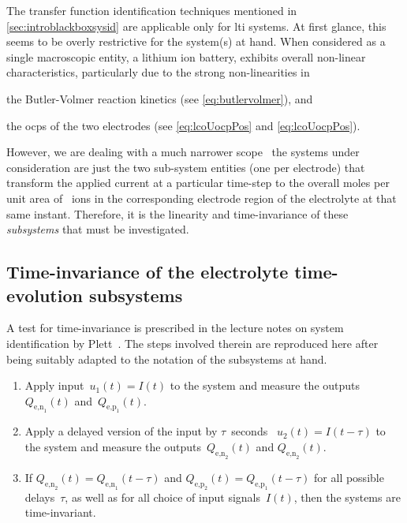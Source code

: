 

The      transfer     function      identification     techniques      mentioned
in \cref{sec:introblackboxsysid} are  applicable only for \gls{lti}  systems. At
first glance,  this seems to  be overly restrictive  for the system(s)  at hand.
When  considered  as  a  single  macroscopic  entity,  a  lithium  ion  battery,
exhibits  overall non-linear  characteristics,  particularly due  to the  strong
non-linearities in
\begin{enumerate*}[label=\emph{\alph*})]
    \item the Butler-Volmer reaction kinetics (see \cref{eq:butlervolmer}), and
    \item the \glspl{ocp} of the two electrodes (see \cref{eq:lcoUocpPos} and \cref{eq:lcoUocpPos}).
\end{enumerate*}
However,  we are  dealing with  a much  narrower scope  \ie~the  systems under
consideration  are just  the two  sub-system entities  (one per  electrode) that
transform the  applied current at  a particular  time-step to the  overall moles
per  unit area  of  ~ions in  the  corresponding  electrode region  of
the  electrolyte at  that  same  instant. Therefore,  it  is  the linearity  and
time-invariance of these \emph{subsystems} that must be investigated.

\subsection{Time-invariance of the electrolyte time-evolution subsystems}\label{subsec:timeinvariance}
A  test  for time-invariance  is  prescribed  in  the  lecture notes  on  system
identification by  Plett~\cite{PlettECE5560_02}. The steps involved  therein are
reproduced here after  being suitably adapted to the notation  of the subsystems
at hand.
\begin{enumerate}
    \item Apply input~${u_1(t) = I(t)}$ to the system and measure the outputs~$Q_{\text{e,n}_1}\!(t)$ and~$Q_{\text{e,p}_1}\!(t)$.
    \item Apply a delayed version of the input by $\tau$~seconds \ie~${u_2(t) = I(t-\tau)}$ to the system and measure the outputs~$Q_{\text{e,n}_2}\!(t)$ and $Q_{\text{e,n}_2}\!(t)$.
    \item If ${Q_{\text{e,n}_2}\!(t) = Q_{\text{e,n}_1}\!(t-\tau)}$ and
        ${Q_{\text{e,p}_2}\!(t) = Q_{\text{e,p}_1}\!(t-\tau)}$ for all possible
        delays~$\tau$, as well as for all choice of input signals~$I(t)$, then the systems are time-invariant.
\end{enumerate}

